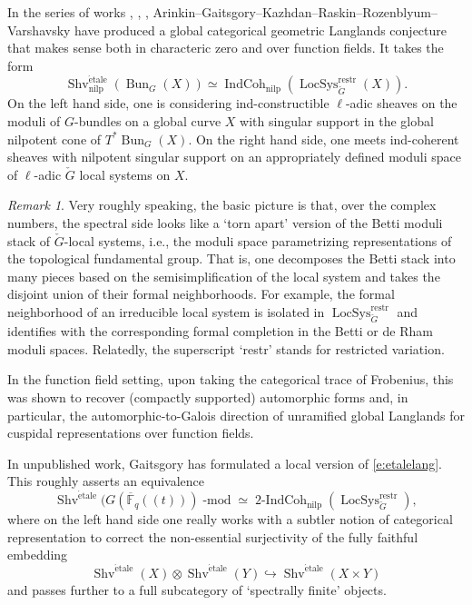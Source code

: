 \documentclass[10pt]{amsart}
\newcommand{\TwoIC}{\on{2-IndCoh}_{\on{nilp}}}
\newcommand{\LS}{\on{LocSys}_{\cG}}
\newcommand{\on}{\operatorname}
\renewcommand{\mod}{\on{-mod}}
\theoremstyle{remark}
\newtheorem{re}[subsubsection]{Remark}
\newcommand{\Bun}{\operatorname{Bun}}
\numberwithin{equation}{section}
\newcommand{\cG}{\check{G}}
\renewcommand{\mod}{\operatorname{-mod}}
\begin{document}
    In the series of works \cite{restrictedvar1}, \cite{restrictedvar2}, \cite{restrictedvar3}, Arinkin--Gaitsgory--Kazhdan--Raskin--Rozenblyum--Varshavsky 
    have produced a global categorical geometric Langlands conjecture that 
    makes sense both in characteric zero and over function fields. It takes the 
    form 
    \begin{equation} \label{e:etalelang}
           \on{Shv}^{\on{\acute{e}tale}}_{\on{nilp}}(\on{Bun}_G(X)) \simeq 
           \on{IndCoh}_{\on{nilp}}(\on{LocSys}_{\cG}^{\on{restr}}(X)).  
    \end{equation}
%
	On the left hand side, one is considering ind-constructible $\ell$-adic sheaves on the moduli of $G$-bundles on a global curve $X$ with singular support in the global nilpotent cone of $T^* \Bun_G(X)$.  On the right hand side, one meets ind-coherent sheaves with nilpotent singular support 
	on an appropriately defined moduli space of $\ell$-adic $\cG$ local systems on $X$. 
	
	\begin{re}
	Very roughly speaking, the basic picture is that, over the complex numbers,	the spectral side looks like a `torn apart' version of the Betti moduli 
	stack of $\cG$-local systems, i.e., the moduli space parametrizing representations of the topological fundamental group. That is, one decomposes the Betti stack into many 
	pieces 
	based on the semisimplification of the local system and 
	takes the disjoint union of their formal neighborhoods. For example, the formal 
	neighborhood of an irreducible 
	local system is isolated in  $\on{LocSys}_{\cG}^{\on{restr}}$ and 
	identifies with the corresponding formal completion in the Betti or de Rham moduli 
	spaces. Relatedly, the superscript `restr' stands for restricted variation. 
	\end{re}
	
	
	
	In the function field setting, upon taking the categorical trace of 
	Frobenius, this was shown to recover (compactly supported) automorphic 
	forms and, in particular, the automorphic-to-Galois direction of unramified 
	global Langlands for cuspidal representations over function fields. 
	
	In unpublished work, Gaitsgory has formulated 
	a local version of \eqref{e:etalelang}. This roughly asserts an equivalence
	\[
	     \on{Shv}^{\on{\acute{e}tale}}(G(\overline{\mathbb{F}}_q(\!(t)\!))\mod \simeq 
	     \TwoIC(\LS^{\on{restr}}),
	\] 
	where on the left hand side one really works with a subtler notion of 
	categorical representation to correct the non-essential surjectivity of 
	the fully faithful embedding
	$$\on{Shv}^{\on{\acute{e}tale}}(X) \otimes \on{Shv}^{\on{\acute{e}tale}}(Y) \hookrightarrow \on{Shv}^{\on{\acute{e}tale}}(X \times Y)$$
	and passes further to a full subcategory of `spectrally finite' objects. 
	
\end{document}
